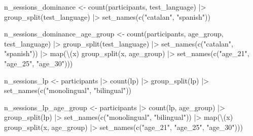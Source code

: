 \documentclass[
  letterpaper,
  DIV=11,
  numbers=noendperiod]{scrartcl}
\newenvironment{Shaded}{\begin{snugshade}}{\end{snugshade}}
\newcommand{\FunctionTok}[1]{\textcolor[rgb]{0.28,0.35,0.67}{#1}}
\newcommand{\NormalTok}[1]{\textcolor[rgb]{0.00,0.23,0.31}{#1}}
\newcommand{\OtherTok}[1]{\textcolor[rgb]{0.00,0.23,0.31}{#1}}
\newcommand{\SpecialCharTok}[1]{\textcolor[rgb]{0.37,0.37,0.37}{#1}}
\newcommand{\StringTok}[1]{\textcolor[rgb]{0.13,0.47,0.30}{#1}}
\begin{document}
\begin{Shaded}
\begin{Highlighting}[]
\NormalTok{n\_sessions\_dominance }\OtherTok{\textless{}{-}} \FunctionTok{count}\NormalTok{(participants, test\_language) }\SpecialCharTok{|\textgreater{}} 
    \FunctionTok{group\_split}\NormalTok{(test\_language) }\SpecialCharTok{|\textgreater{}} 
    \FunctionTok{set\_names}\NormalTok{(}\FunctionTok{c}\NormalTok{(}\StringTok{"catalan"}\NormalTok{, }\StringTok{"spanish"}\NormalTok{))}

\NormalTok{n\_sessions\_dominance\_age\_group }\OtherTok{\textless{}{-}} \FunctionTok{count}\NormalTok{(participants, age\_group, test\_language) }\SpecialCharTok{|\textgreater{}} 
    \FunctionTok{group\_split}\NormalTok{(test\_language) }\SpecialCharTok{|\textgreater{}} 
    \FunctionTok{set\_names}\NormalTok{(}\FunctionTok{c}\NormalTok{(}\StringTok{"catalan"}\NormalTok{, }\StringTok{"spanish"}\NormalTok{)) }\SpecialCharTok{|\textgreater{}} 
    \FunctionTok{map}\NormalTok{(\textbackslash{}(x) }\FunctionTok{group\_split}\NormalTok{(x, age\_group) }\SpecialCharTok{|\textgreater{}} 
            \FunctionTok{set\_names}\NormalTok{(}\FunctionTok{c}\NormalTok{(}\StringTok{"age\_21"}\NormalTok{, }\StringTok{"age\_25"}\NormalTok{, }\StringTok{"age\_30"}\NormalTok{)))}

\NormalTok{n\_sessions\_lp }\OtherTok{\textless{}{-}}\NormalTok{ participants }\SpecialCharTok{|\textgreater{}} 
    \FunctionTok{count}\NormalTok{(lp) }\SpecialCharTok{|\textgreater{}} 
    \FunctionTok{group\_split}\NormalTok{(lp) }\SpecialCharTok{|\textgreater{}} 
    \FunctionTok{set\_names}\NormalTok{(}\FunctionTok{c}\NormalTok{(}\StringTok{"monolingual"}\NormalTok{, }\StringTok{"bilingual"}\NormalTok{))}

\NormalTok{n\_sessions\_lp\_age\_group }\OtherTok{\textless{}{-}}\NormalTok{ participants }\SpecialCharTok{|\textgreater{}} 
    \FunctionTok{count}\NormalTok{(lp, age\_group) }\SpecialCharTok{|\textgreater{}} 
    \FunctionTok{group\_split}\NormalTok{(lp) }\SpecialCharTok{|\textgreater{}} 
    \FunctionTok{set\_names}\NormalTok{(}\FunctionTok{c}\NormalTok{(}\StringTok{"monolingual"}\NormalTok{, }\StringTok{"bilingual"}\NormalTok{)) }\SpecialCharTok{|\textgreater{}} 
    \FunctionTok{map}\NormalTok{(\textbackslash{}(x) }\FunctionTok{group\_split}\NormalTok{(x, age\_group) }\SpecialCharTok{|\textgreater{}} 
            \FunctionTok{set\_names}\NormalTok{(}\FunctionTok{c}\NormalTok{(}\StringTok{"age\_21"}\NormalTok{, }\StringTok{"age\_25"}\NormalTok{, }\StringTok{"age\_30"}\NormalTok{)))}
\end{Highlighting}
\end{Shaded}
\end{document}
